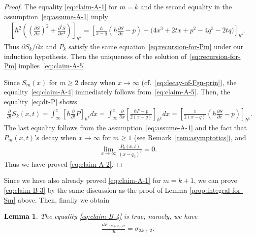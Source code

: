 \documentclass[pdftex]{sigma}
\newtheorem{lem}[thm]{Lemma}
\theoremstyle{definition}
\numberwithin{equation}{section}
\def\p{\partial}
\begin{document}
\begin{proof}
The equality \eqref{eq:claim-A-1} for $m=k$ and
the second equality in the assumption~\eqref{eq:assume-A-1}
imply
\begin{gather*}
\left[
\hbar^{2}\left( \left(\frac{\p S}{\p x}\right)^{2} +
\frac{\p^{2} S}{\p x^{2}} \right)
\right]_{\hbar^{k}}
= \left[ \frac{\hbar}{x-q}\left( \hbar \frac{\p S}{\p x} - p \right)
+ \big(4x^{3}+2t x + p^{2} - 4q^{3}-2tq\big) \right]_{\hbar^{k}}.
\end{gather*}
Thus ${\p S_{k}}/{\p x}$ and $P_{k}$ satisfy the
same equation~\eqref{eq:recursion-for-Pm} under our induction hypothesis.
Then the uniqueness of the solution of~\eqref{eq:recursion-for-Pm}
implies~\eqref{eq:claim-A-5}.

Since $S_{m}(x)$ for $m \ge 2$ decay when
$x \rightarrow \infty$
(cf.~\eqref{eq:decay-of-Fgn-prin}),
the equality~\eqref{eq:claim-A-4}
immediately follows from~\eqref{eq:claim-A-5}.
Then, the equality~\eqref{eq:dt-P} shows
\begin{gather*}
\frac{\p}{\p t} S_{k}(x,t)   =
\int^{x}_{\infty} \left[ \hbar \frac{\p}{\p t} P
\right]_{\hbar^{k}}dx
  =
\int^{x}_{\infty} \frac{\p}{\p x} \left[
\frac{\hbar P - p}{2(x-q)} \right]_{\hbar^{k}} dx
  =
\left[
\frac{1}{2(x-q)} \left( \hbar \frac{\p S}{\p x} - p \right)
\right]_{\hbar^{k}}.
\end{gather*}
The last equality follows from the assumption~\eqref{eq:assume-A-1} and the fact that
$P_{m}(x,t)$'s decay when $x \rightarrow \infty$
for $m \ge 1$ (see Remark~\ref{rem:asymptotics}),
and
\begin{gather*}
\lim_{x\rightarrow\infty} \frac{P_{0}(x,t)}{(x-q_{0})^{2}} = 0.
\end{gather*}
Thus we have proved \eqref{eq:claim-A-2}.
\end{proof}

Since we have also already proved \eqref{eq:claim-A-1}
for $m = k+1$, we can prove \eqref{eq:claim-B-3}
by the same discussion as the proof of
Lemma \ref{prop:integral-for-Sm} above.
Then, f\/inally we obtain

\begin{lem} \label{prop:partial-taufunction-conjecture}
The equality \eqref{eq:claim-B-4} is true; namely, we have
\begin{gather}\label{eq:claim-B-5}
\frac{dF_{(k+2)/2}}{dt} = \sigma_{2k+2}.
\end{gather}
\end{lem}
\end{document}
